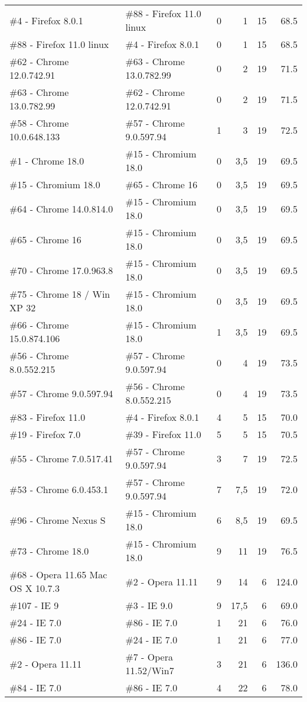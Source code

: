 \documentclass[10pt]{IEEEtran}
\begin{document}
\begin{table*}[h]
\begin{tabular}{llrrrr}
    \#4 - Firefox 8.0.1 & \#88 - Firefox 11.0 linux & 0     & 1     & 15    & 68.5 \\
    \#88 - Firefox 11.0 linux & \#4 - Firefox 8.0.1 & 0     & 1     & 15    & 68.5 \\
    \#62 - Chrome 12.0.742.91 & \#63 - Chrome 13.0.782.99  & 0     & 2     & 19    & 71.5 \\
    \#63 - Chrome 13.0.782.99  & \#62 - Chrome 12.0.742.91 & 0     & 2     & 19    & 71.5 \\
    \#58 - Chrome 10.0.648.133 & \#57 - Chrome 9.0.597.94 & 1     & 3     & 19    & 72.5 \\
    \#1 - Chrome 18.0 & \#15 - Chromium 18.0 & 0     & 3,5   & 19    & 69.5 \\
    \#15 - Chromium 18.0 & \#65 - Chrome 16 & 0     & 3,5   & 19    & 69.5 \\
    \#64 - Chrome 14.0.814.0 & \#15 - Chromium 18.0 & 0     & 3,5   & 19    & 69.5 \\
    \#65 - Chrome 16 & \#15 - Chromium 18.0 & 0     & 3,5   & 19    & 69.5 \\
    \#70 - Chrome 17.0.963.8 & \#15 - Chromium 18.0 & 0     & 3,5   & 19    & 69.5 \\
    \#75 - Chrome 18 / Win XP 32 & \#15 - Chromium 18.0 & 0     & 3,5   & 19    & 69.5 \\
    \#66 - Chrome 15.0.874.106 & \#15 - Chromium 18.0 & 1     & 3,5   & 19    & 69.5 \\
    \#56 - Chrome 8.0.552.215 & \#57 - Chrome 9.0.597.94 & 0     & 4     & 19    & 73.5 \\
    \#57 - Chrome 9.0.597.94 & \#56 - Chrome 8.0.552.215 & 0     & 4     & 19    & 73.5 \\
    \#83 - Firefox 11.0 & \#4 - Firefox 8.0.1 & 4     & 5     & 15    & 70.0 \\
    \#19 - Firefox 7.0 & \#39 - Firefox 11.0 & 5     & 5     & 15    & 70.5 \\
    \#55 - Chrome 7.0.517.41 & \#57 - Chrome 9.0.597.94 & 3     & 7     & 19    & 72.5 \\
    \#53 - Chrome 6.0.453.1 & \#57 - Chrome 9.0.597.94 & 7     & 7,5   & 19    & 72.0 \\
    \#96 - Chrome Nexus S & \#15 - Chromium 18.0 & 6     & 8,5   & 19    & 69.5 \\
    \#73 - Chrome 18.0 & \#15 - Chromium 18.0 & 9     & 11    & 19    & 76.5 \\
    \#68 - Opera 11.65 Mac OS X 10.7.3 & \#2 - Opera 11.11 & 9     & 14    & 6     & 124.0 \\
    \#107 - IE 9 & \#3 - IE 9.0 & 9     & 17,5  & 6     & 69.0 \\
    \#24 - IE 7.0 & \#86 - IE 7.0 & 1     & 21    & 6     & 76.0 \\
    \#86 - IE 7.0 & \#24 - IE 7.0 & 1     & 21    & 6     & 77.0 \\
    \#2 - Opera 11.11 & \#7 - Opera 11.52/Win7 & 3     & 21    & 6     & 136.0 \\
    \#84 - IE 7.0 & \#86 - IE 7.0 & 4     & 22    & 6     & 78.0 \\
    \hline
    \end{tabular}
  \label{tab:distancetable1}
\end{table*}
\end{document}
